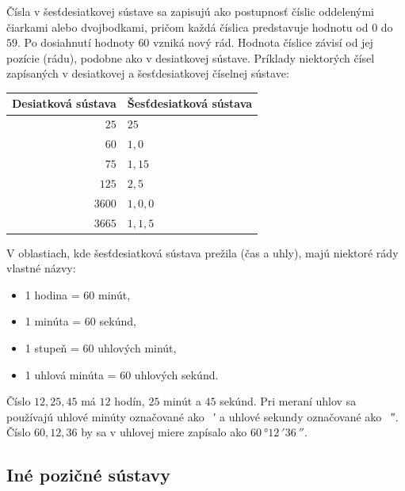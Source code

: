 \documentclass{report}
\begin{document}
Čísla v šesťdesiatkovej sústave sa zapisujú ako postupnosť číslic oddelenými čiarkami alebo dvojbodkami, pričom každá číslica predstavuje hodnotu od \(0\) do \(59\). Po dosiahnutí hodnoty \(60\) vzniká nový rád. Hodnota číslice závisí od jej pozície (rádu), podobne ako v desiatkovej sústave. Príklady niektorých čísel zapísaných v desiatkovej a šesťdesiatkovej číselnej sústave:
\begin{center}
\begin{tabular}{r|l}

\textbf{Desiatková sústava} & \textbf{Šesťdesiatková sústava} \\
\hline
\(25\) & \(25\) \\

\(60\) & \(1,0\)  \\

\(75\) & \(1,15\)  \\

\(125\) & \(2,5\) \\

\(3600\) & \(1,0,0\)  \\

\(3665\) & \(1,1,5\)  \\

\end{tabular}
\end{center}

V oblastiach, kde šesťdesiatková sústava prežila (čas a uhly), majú niektoré rády vlastné názvy:
\begin{itemize}
  \item 1 hodina = 60 minút,
  \item 1 minúta = 60 sekúnd,
  \item 1 stupeň = 60 uhlových minút,
  \item 1 uhlová minúta = 60 uhlových sekúnd.
\end{itemize}
Číslo \(12, 25, 45\) má \(12\) hodín, \(25\) minút a \(45\) sekúnd. Pri meraní uhlov sa používajú uhlové minúty označované ako \SI{}{\arcminute} a uhlové sekundy označované ako \SI{}{\arcsecond}. Číslo \(60, 12, 36\) by sa v uhlovej miere zapísalo ako \(\SI{60}{\degree} \SI{12}{\arcminute} \SI{36}{\arcsecond}\).

\subsection{Iné pozičné sústavy}
\end{document}

